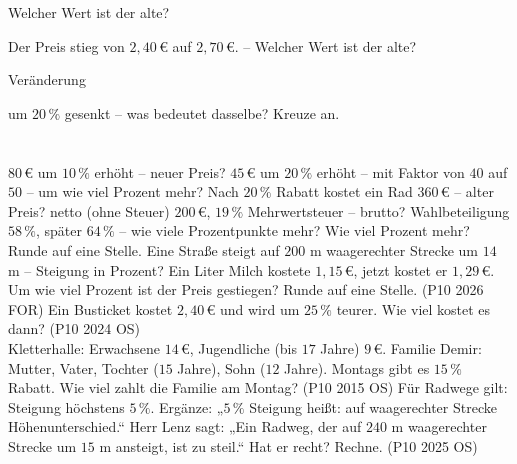 \setcounter{aufgabe}{22}

\begin{aufgabe}{Welcher Wert ist der alte?}
\begin{teile}
\teil Der Preis stieg von $2{,}40\,€$ auf $2{,}70\,€$. – Welcher Wert ist der alte?
\end{teile}
\end{aufgabe}

\begin{aufgabe}{Veränderung}
\begin{teile}
\teil um $20\,\%$ gesenkt – was bedeutet dasselbe? Kreuze an.\\ \\ \\ 
\teil $80\,€$ um $10\,\%$ erhöht – neuer Preis? \leerfeld[€]
\teil $45\,€$ um $20\,\%$ erhöht – mit Faktor \leerfeld[€]
\teil von $40$ auf $50$ – um wie viel Prozent mehr? \leerfeld[\%]
\teil Nach $20\,\%$ Rabatt kostet ein Rad $360\,€$ – alter Preis? \leerfeld[€]
\teil netto (ohne Steuer) $200\,€$, $19\,\%$ Mehrwertsteuer – brutto? \leerfeld[€]
\teil Wahlbeteiligung $58\,\%$, später $64\,\%$ – wie viele Prozentpunkte mehr? Wie viel Prozent mehr? Runde auf eine Stelle.
\teil Eine Straße steigt auf $200$ m waagerechter Strecke um $14$ m – Steigung in Prozent? \leerfeld[\%]
\teil Ein Liter Milch kostete $1{,}15\,€$, jetzt kostet er $1{,}29\,€$. Um wie viel Prozent ist der Preis gestiegen? Runde auf eine Stelle. \hfill (P10 2026 FOR)
\teil Ein Busticket kostet $2{,}40\,€$ und wird um $25\,\%$ teurer. Wie viel kostet es dann? \hfill (P10 2024 OS) \\ \leerfeld[€]
\teil Kletterhalle: Erwachsene $14\,€$, Jugendliche (bis $17$ Jahre) $9\,€$. Familie Demir: Mutter, Vater, Tochter ($15$ Jahre), Sohn ($12$ Jahre). Montags gibt es $15\,\%$ Rabatt. Wie viel zahlt die Familie am Montag? \hfill (P10 2015 OS)
\teil Für Radwege gilt: Steigung höchstens $5\,\%$. Ergänze: „$5\,\%$ Steigung heißt: auf \leerfeld[m] waagerechter Strecke \leerfeld[m] Höhenunterschied.“ Herr Lenz sagt: „Ein Radweg, der auf $240$ m waagerechter Strecke um $15$ m ansteigt, ist zu steil.“ Hat er recht? Rechne. \hfill (P10 2025 OS)
\end{teile}
\end{aufgabe}

